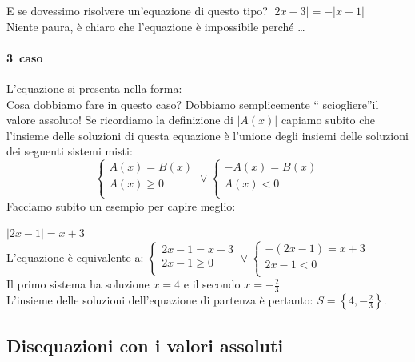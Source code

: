 \begin{esempio}
E se dovessimo risolvere un'equazione di questo tipo? \(|2x-3|=-|x+1|\) \\[4pt]
Niente paura, è chiaro che l'equazione è impossibile perché \dots
\end{esempio}

\paragraph{3\textdegree~caso} L'equazione si presenta nella forma:  
\\[4pt]
Cosa dobbiamo fare in questo caso? Dobbiamo semplicemente \textquotedblleft 
sciogliere\textquotedblright il valore assoluto!
Se ricordiamo la definizione di $|A(x)|$ capiamo subito che l'insieme delle 
soluzioni di questa equazione è l'unione degli insiemi delle soluzioni dei 
seguenti sistemi misti:
$$
\left\lbrace 
\begin{array}{l}
A(x)=B(x)\\
A(x)\geq 0\\
\end{array}
\right.
\vee
\left\lbrace 
\begin{array}{l}
-A(x)=B(x)\\
A(x)< 0\\
\end{array}
\right.
$$
Facciamo subito un esempio per capire meglio:
\begin{esempio}  \(|2x-1|=x+3\)\\[4pt] L'equazione è equivalente a:
\(
\left\lbrace 
\begin{array}{l}
2x-1=x+3\\
2x-1\geq 0\\
\end{array}
\right.
\vee
\left\lbrace 
\begin{array}{l}
-(2x-1)=x+3\\
2x-1< 0\\
\end{array}
\right.
\) \\
Il primo sistema ha soluzione $x=4$ e il secondo $x=-\frac{2}{3}$\\[4pt]
L'insieme delle soluzioni dell'equazione di partenza è pertanto: 
$S=\left\lbrace 4,-\frac{2}{3} \right\rbrace $.
\end{esempio}

\subsection{Disequazioni con i valori assoluti}

